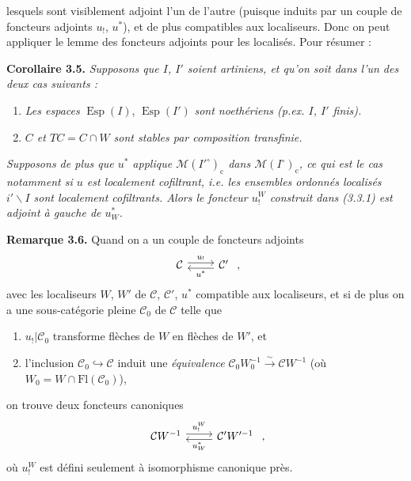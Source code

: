 \documentclass[11pt]{article}
\newcommand{\printedpage}[1]{\marginpar{\footnotesize p.~#1}}
\newcommand{\msp}[1]{\marginpar{\footnotesize [#1]}}
\newcommand{\Fl}{\mathrm{Fl}}
\newcommand{\M}{\mathcal{M}}
\newcommand{\Esp}{\operatorname{Esp}}
\begin{document}
\printedpage{29}
lesquels sont visiblement adjoint l'un de l'autre (puisque induits par un couple de foncteurs %
adjoints $u_!$, $u^*$), et de plus compatibles aux localiseurs. Donc on peut appliquer le lemme des foncteurs adjoints pour les localisés. Pour résumer :

\textbf{Corollaire 3.5.} \textit{Supposons que $I$, $I'$ soient artiniens, et qu'on soit dans l'un des deux cas suivants :}
\begin{enumerate}
\item[a)] \textit{Les espaces} $\Esp(I)$, $\Esp(I')$ \textit{sont noethériens (p.ex. $I$, $I'$ finis).}
\msp{page 58}
\item[b)] \textit{$C$ et $TC = C\cap W$ sont stables par composition transfinie.}
\end{enumerate}
\textit{Supposons de plus que $u^*$ applique $\M(I'^\circ)_{\mathrm{c}}$ dans $\M(I^\circ)_{\mathrm{c}}$, ce qui est le cas notamment si $u$ est localement cofiltrant, i.e. les ensembles ordonnés localisés $i'\backslash I$ sont localement cofiltrants. Alors le foncteur $u_!^W$ construit dans (3.3.1) est adjoint à gauche de $u_W^*$.}

\textbf{Remarque 3.6.} Quand on a un couple de foncteurs adjoints
\[
\begin{tikzcd}
\mathcal{C} \arrow[r, shift left, "u_!"] & \mathcal{C}' \arrow[l, shift left, "u^*"]
\end{tikzcd}
\ ,
\]
avec les localiseurs $W$, $W'$ de $\mathcal{C}$, $\mathcal{C}'$, $u^*$ compatible aux localiseurs, et si de plus on a une sous-catégorie pleine $\mathcal{C}_0$ de $\mathcal{C}$ telle que
\begin{enumerate}
\item[a)] $u_!|\mathcal{C}_0$ transforme flèches de $W$ en flèches de $W'$, et
\item[b)] l'inclusion $\mathcal{C}_0 \hookrightarrow \mathcal{C}$ induit une \textit{équivalence} $\mathcal{C}_0W_0^{-1} \xrightarrow{\sim} \mathcal{C}W^{-1}$ (où $W_0 = W\cap\Fl(\mathcal{C}_0)$),
\end{enumerate}
on trouve deux foncteurs canoniques
\[
\begin{tikzcd}
\mathcal{C}W^{-1} \arrow[r, shift left, "u_!^W"] & \mathcal{C}'W'^{-1} \arrow[l, shift left, "u_W^*"]
\end{tikzcd}
\ ,
\]
où $u_!^W$ est défini seulement à isomorphisme canonique près.
\end{document}
